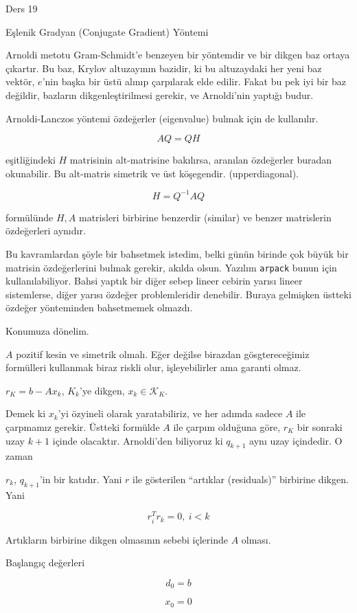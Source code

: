 \documentclass[12pt,fleqn]{article}\usepackage{../../common}
\begin{document}
Ders 19

Eşlenik Gradyan (Conjugate Gradient) Yöntemi 

Arnoldi metotu Gram-Schmidt'e benzeyen bir yöntemdir ve bir dikgen baz
ortaya çıkartır. Bu baz, Krylov altuzayının bazidir, ki bu altuzaydaki her
yeni baz vektör, $e$'nin başka bir üstü alınıp çarpılarak elde
edilir. Fakat bu pek iyi bir baz değildir, bazların dikgenleştirilmesi
gerekir, ve Arnoldi'nin yaptığı budur.

Arnoldi-Lanczos yöntemi özdeğerler (eigenvalue) bulmak için de kullanılır.

$$ AQ = QH $$

eşitliğindeki $H$ matrisinin alt-matrisine bakılırsa, aranılan özdeğerler
buradan okunabilir. Bu alt-matris simetrik ve üst köşegendir.
(upperdiagonal). 

$$ H = Q^{-1}AQ $$

formülünde $H,A$ matrisleri birbirine benzerdir (similar) ve benzer
matrislerin özdeğerleri aynıdır. 

Bu kavramlardan şöyle bir bahsetmek istedim, belki günün birinde çok büyük
bir matrisin özdeğerlerini bulmak gerekir, akılda olsun. Yazılım
\verb!arpack! bunun için kullanılabiliyor. Bahsi yaptık bir diğer sebep
lineer cebirin yarısı lineer sistemlerse, diğer yarısı özdeğer
problemleridir denebilir. Buraya gelmişken üstteki özdeğer yönteminden
bahsetmemek olmazdı.

Konumuza dönelim. 

$A$ pozitif kesin ve simetrik olmalı. Eğer değilse birazdan gösgtereceğimiz
formülleri kullanmak biraz riskli olur, işleyebilirler ama garanti olmaz. 

$r_K = b - Ax_k $, $K_k$'ye dikgen, $x_k \in \mathscr{K}_K$. 

Demek ki $x_k$'yi özyineli olarak yaratabiliriz, ve her adımda sadece $A$
ile çarpmamız gerekir. Üstteki formülde $A$ ile çarpım olduğuna göre, $r_K$
bir sonraki uzay $k+1$ içinde olacaktır. Arnoldi'den biliyoruz ki $q_{k+1}$
aynı uzay içindedir. O zaman 

$r_k$, $q_{k+1}$'in bir katıdır. Yani $r$ ile gösterilen ``artıklar
(residuals)'' birbirine dikgen. Yani 

$$ r_i^Tr_k = 0, \ i < k $$

Artıkların birbirine dikgen olmasının sebebi içlerinde $A$ olması. 

Başlangıç değerleri

$$ d_0 = b $$

$$ x_0 = 0 $$
\end{document}
